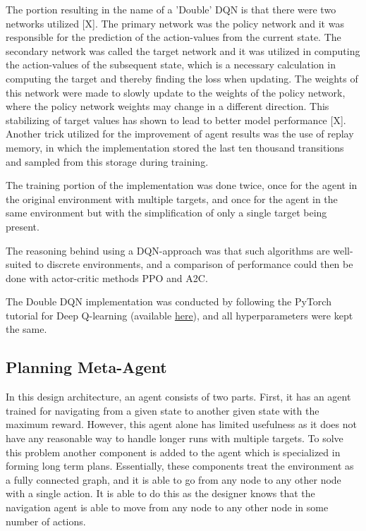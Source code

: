 \documentclass{article}
\begin{document}
	The portion resulting in the name of a 'Double' DQN is that there were two networks utilized [X]. The primary network was the policy network and it was responsible for the prediction of the action-values from the current state. The secondary network was called the target network and it was utilized in computing the action-values of the subsequent state, which is a necessary calculation in computing the target and thereby finding the loss when updating. The weights of this network were made to slowly update to the weights of the policy network, where the policy network weights may change in a different direction. This stabilizing of target values has shown to lead to better model performance [X]. Another trick utilized for the improvement of agent results was the use of replay memory, in which the implementation stored the last ten thousand transitions and sampled from this storage during training.
	
	The training portion of the implementation was done twice, once for the agent in the original environment with multiple targets, and once for the agent in the same environment but with the simplification of only a single target being present.
	
	The reasoning behind using a DQN-approach was that such algorithms are well-suited to discrete environments, and a comparison of performance could then be done with actor-critic methods PPO and A2C.
	
	The Double DQN implementation was conducted by following the PyTorch tutorial for Deep Q-learning (available \href{https://pytorch.org/tutorials/intermediate/reinforcement_q_learning.html}{here}), and all hyperparameters were kept the same.
	
	
	\subsection{Planning Meta-Agent}
	\label{planning}
	In this design architecture, an agent consists of two parts. First, it has an agent trained for navigating from a given state to another given state with the maximum reward. However, this agent alone has limited usefulness as it does not have any reasonable way to handle longer runs with multiple targets. To solve this problem another component is added to the agent which is specialized in forming long term plans. Essentially, these components treat the environment as a fully connected graph, and it is able to go from any node to any other node with a single action. It is able to do this as the designer knows that the navigation agent is able to move from any node to any other node in some number of actions.
	
\end{document}
